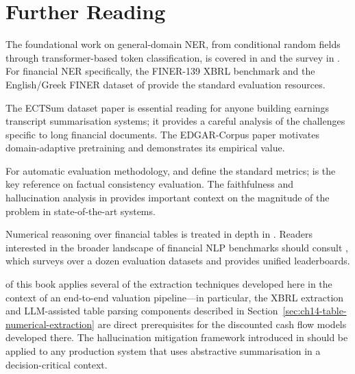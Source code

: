 \section{Further Reading}
\label{sec:ch14-further-reading}

The foundational work on general-domain NER, from conditional random fields through
transformer-based token classification, is covered in \citet{lample2016neural} and the
survey in \citet{devlin2019}. For financial NER specifically, the FINER-139 XBRL
benchmark \citep{loukas2022finer} and the English/Greek FINER dataset of
\citet{shah2023finer} provide the standard evaluation resources.

The ECTSum dataset paper \citep{mukherjee2022ectsum} is essential reading for anyone
building earnings transcript summarisation systems; it provides a careful analysis of
the challenges specific to long financial documents. The EDGAR-Corpus paper
\citep{loukas2021edgar} motivates domain-adaptive pretraining and demonstrates its
empirical value.

For automatic evaluation methodology, \citet{lin2004rouge} and \citet{zhang2020bertscore}
define the standard metrics; \citet{kryscinski2020evaluating} is the key reference on
factual consistency evaluation. The faithfulness and hallucination analysis in
\citet{maynez2020faithfulness} provides important context on the magnitude of the problem
in state-of-the-art systems.

Numerical reasoning over financial tables is treated in depth in \citet{chen2021finqa}.
Readers interested in the broader landscape of financial NLP benchmarks should consult
\citet{xie2024finben}, which surveys over a dozen evaluation datasets and provides
unified leaderboards.

 of this book applies several of the extraction
techniques developed here in the context of an end-to-end valuation pipeline---in
particular, the XBRL extraction and LLM-assisted table parsing components described in
Section~\ref{sec:ch14-table-numerical-extraction} are direct prerequisites for the
discounted cash flow models developed there. The hallucination mitigation framework
introduced in  should be applied to any production system that uses abstractive
summarisation in a decision-critical context.
